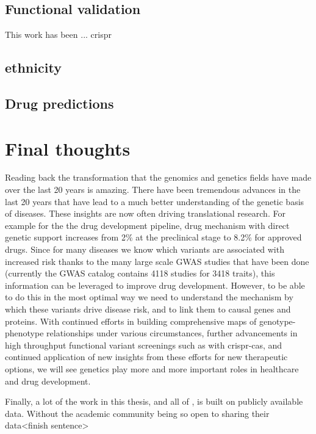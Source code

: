 \subsection{Functional validation}
This work has been ... crispr

\subsection{ethnicity}

\subsection{Drug predictions}


\section{Final thoughts}
Reading back the transformation that the genomics and genetics fields have made over the last 20 years is amazing. There have been tremendous advances in the last 20 years that have lead to a much better understanding of the genetic basis of diseases. These insights are now often driving translational research. For example for the the drug development pipeline, drug mechanism with direct genetic support increases from 2\% at the preclinical stage to 8.2\% for approved drugs\cite{nelsonSupportHumanGenetic2015d}. Since for many diseases we know which variants are associated with increased risk thanks to the many large scale GWAS studies that have been done (currently the GWAS catalog\cite{macarthurNewNHGRIEBICatalog2017a} contains 4118 studies for 3418 traits), this information can be leveraged to improve drug development. However, to be able to do this in the most optimal way we need to understand the mechanism by which these variants drive disease risk, and to link them to causal genes and proteins.
 With continued efforts in building comprehensive maps of genotype-phenotype relationships under various circumstances, further advancements in high throughput functional variant screenings such as with crispr-cas, and continued application of new insights from these efforts for new therapeutic options, we will see genetics play more and more important roles in healthcare and drug development. 

Finally, a lot of the work in this thesis, and all of , is built on publicly available data. Without the academic community being so open to sharing their data<finish sentence> 
